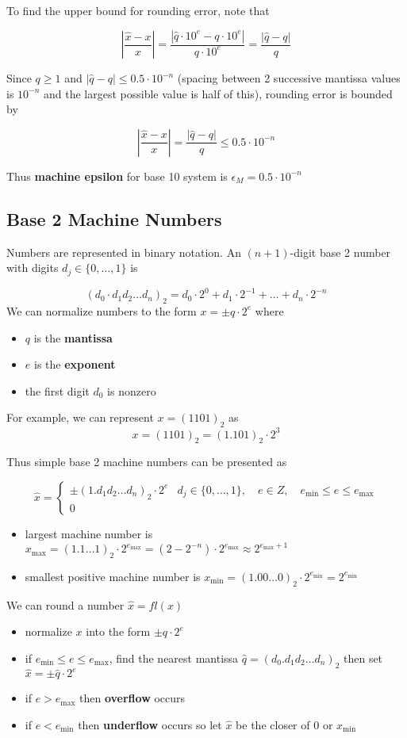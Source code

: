 \documentclass{article}
\begin{document}
To find the upper bound for rounding error, note that

\[\left| \frac{\hat{x} - x}{x} \right| = \frac{|\hat{q} \cdot 10^e - q \cdot 10^e|}{q \cdot 10^e} = \frac{|\hat{q} - q|}{q}\]

Since $q \geq 1$ and $|\hat{q} - q| \leq 0.5 \cdot 10^{-n}$ (spacing between 2 successive mantissa values is $10^{-n}$ and the largest possible value is half of this), rounding error is bounded by

\[\left| \frac{\hat{x} - x}{x} \right| = \frac{|\hat{q} - q|}{q} \leq 0.5 \cdot 10^{-n}\]

Thus \textbf{machine epsilon} for base 10 system is $\epsilon_M = 0.5 \cdot 10^{-n}$

\subsection{Base 2 Machine Numbers}
Numbers are represented in binary notation. An $(n+1)$-digit base 2 number with digits $d_j \in \{0, \ldots, 1\}$ is

\[(d_0 \cdot d_1 d_2 \ldots d_n)_2 = d_0 \cdot 2^0 + d_1 \cdot 2^{-1} + \ldots + d_n \cdot 2^{-n}\]
We can normalize numbers to the form $x = \pm q \cdot 2^e$ where
\begin{itemize}
  \item $q$ is the \textbf{mantissa}
  \item $e$ is the \textbf{exponent}
  \item the first digit $d_0$ is nonzero
\end{itemize}
For example, we can represent $x = (1101)_2$ as
\[x = (1101)_2 = (1.101)_2 \cdot 2^3\]

Thus simple base 2 machine numbers can be presented as

\[\hat{x} = \begin{cases} \pm (1. d_1 d_2 \ldots d_n)_{2} \cdot 2^e & d_j \in \{0, \ldots, 1\}, \quad e \in Z, \quad e_{\min} \leq e \leq e_{\max} \\ 0 \end{cases}\]
\begin{itemize}
  \item largest machine number is $x_{\max} = (1.1 \ldots 1)_{2} \cdot 2^{e_{\max}} = (2 - 2^{-n}) \cdot 2^{e_{\max}} \approx 2^{e_{\max} + 1}$
  \item smallest positive machine number is $x_{\min} = (1.00 \ldots 0)_2 \cdot 2^{e_{\min}} = 2^{e_{\min}}$
\end{itemize}
We can round a number $\hat{x} = fl(x)$
\begin{itemize}
  \item normalize $x$ into the form $\pm q \cdot 2^e$
  \item if $e_{\min} \leq e \leq e_{\max}$, find the nearest mantissa $\hat{q} = (d_0.d_1 d_2 \ldots d_n)_{2}$ then set $\hat{x} = \pm \hat{q} \cdot 2^e$
  \item if $e > e_{\max}$ then \textbf{overflow} occurs
  \item if $e < e_{\min}$ then \textbf{underflow} occurs so let $\hat{x}$ be the closer of $0$ or $x_{\min}$
\end{itemize}
\end{document}
